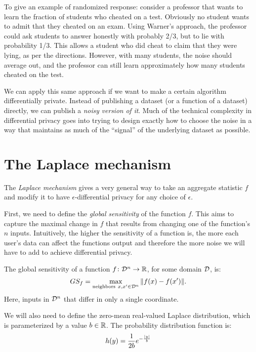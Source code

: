 To give an example of randomized response:
consider a professor that wants to
learn the fraction of students who cheated on
a test. Obviously no student wants to admit 
that they cheated on an exam.
Using Warner's approach, the professor
could ask students to answer honestly with
probably 2/3, but to lie with probability 1/3.
This allows a student who did cheat to claim that
they were lying, as per the directions. However,
with many students, the noise should average out,
and the professor can still learn approximately
how many students cheated on the test.

We can apply this same approach if we want to make
a certain algorithm differentially private.
Instead of publishing a dataset (or a function of a dataset)
directly, we can publish a \emph{noisy version of it}.
Much of the technical complexity in differential
privacy goes into trying to design exactly how to
choose the noise in a way that maintains as much of
the ``signal'' of the underlying dataset as possible.

\section{The Laplace mechanism}
The \emph{Laplace mechanism} gives a very general 
way to take an aggregate statistic $f$ and modify 
it to have $\epsilon$-differential privacy
for any choice of $\epsilon$.

First, we need to define the
\emph{global sensitivity} of the function $f$. This
aims to capture the maximal change in $f$ that
results from changing one of the function's $n$
inputs.
Intuitively, the higher the sensitivity of
a function is, the more each user's data
can affect the functions output
and therefore the more noise we will have
to add to achieve differential privacy.

\begin{definition}
	The global sensitivity of a function $f \colon \mathcal{D}^n \to \mathbb{R}$,
  for some domain $\mathcal{D}$, is:
	\[ GS_f = \max_{\text{neighbors}~x, x' \in \mathcal{D}^n} \| f(x) - f(x') \|. \]
	Here,  inputs in $\mathcal{D}^n$ 
  that differ in only a single coordinate.
\end{definition}

We will also need to define the zero-mean real-valued Laplace distribution,
which is parameterized by a value $b \in \mathbb{R}$.
The probability distribution function is:
\[ h(y) = \frac{1}{2b} e^{-\frac{\left| y \right|}{b}} \]

